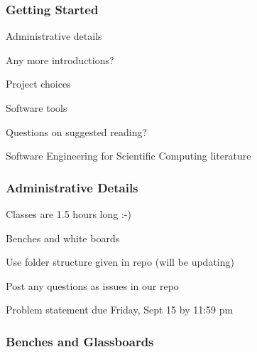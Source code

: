\documentclass[t,12pt,numbers,fleqn]{beamer}
\begin{document}




\begin{frame}
\frametitle{Getting Started}

\bi
\item Administrative details
\item Any more introductions?
\item Project choices
\item Software tools
\item Questions on suggested reading?
\item Software Engineering for Scientific Computing literature
\ei

\end{frame}


\begin{frame}
\frametitle{Administrative Details}

\bi
\item Classes are 1.5 hours long  :-)
\item Benches and white boards
\item Use folder structure given in repo (will be updating)
\item Post any questions as issues in our repo
\item Problem statement due Friday, Sept 15 by 11:59 pm
\ei

\end{frame}


\begin{frame}
\frametitle{Benches and Glassboards}


\end{frame}

\end{document}
